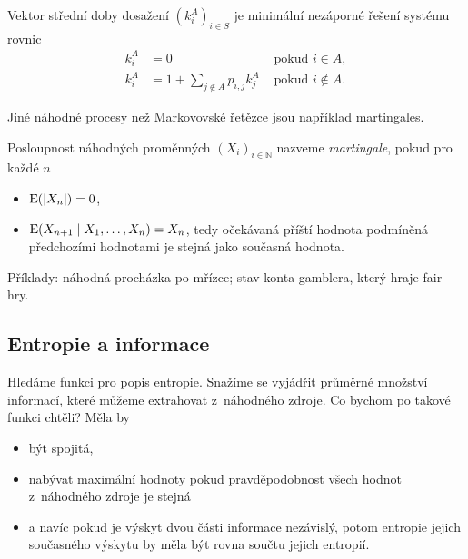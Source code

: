 \begin{example}
\end{example}

\begin{theorem}
    Vektor střední doby dosažení $(k^A_i)_{i \in S}$
    je minimální nezáporné řešení systému rovnic
    \begin{align*}
        k^A_i &= 0 &\text{ pokud } i \in A, \\
        k^A_i &= 1 + \sum_{j \not \in A} p_{i,j} k^A_j &\text{ pokud } i \not \in A.
    \end{align*}
\end{theorem}

\begin{example}
\end{example}

Jiné náhodné procesy než Markovovské řetězce jsou například martingales.

\begin{definition}
    Posloupnost náhodných proměnných $(X_i)_{i \in \mathbb{N}}$ nazveme
    {\em martingale}, pokud pro každé $n$
    \begin{itemize}
        \item $\operatorname{E}(\lvert X_n \rvert) = 0$,
        \item $\operatorname{E}(X_{n+1} \mid X_1, \ldots, X_n) = X_n$,
            tedy očekávaná příští hodnota podmíněná předchozími
            hodnotami je stejná jako současná hodnota.
    \end{itemize}
\end{definition}

Příklady: náhodná procházka po mřízce; stav konta gamblera, který hraje
fair hry.

\subsection{Entropie a informace}

Hledáme funkci pro popis entropie.
Snažíme se vyjádřit průměrné množství informací, které můžeme extrahovat
z~náhodného zdroje. Co bychom po takové funkci chtěli? Měla by
\begin{itemize}
    \item být spojitá,
    \item nabývat maximální hodnoty pokud pravděpodobnost všech hodnot
z~náhodného zdroje je stejná
    \item a navíc pokud je výskyt dvou části informace
nezávislý, potom entropie jejich současného výskytu by měla být rovna
součtu jejich entropií.
\end{itemize}

